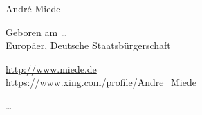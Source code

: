 \documentclass[10pt,a4paper]{scrartcl}
\begin{document}
    \begin{cv}{}
        \begin{cvlist}{}\label{PersDat}  
            \item   Andr\'e Miede
            \item   Geboren am \dots \\	
                    Europ\"aer, Deutsche Staatsb\"urgerschaft 
            \item   \url{http://www.miede.de} \\				
                    \url{https://www.xing.com/profile/Andre_Miede}				
        \end{cvlist}
        
        \begin{cvlist}{}\label{irgendwas}
            \item   \dots
        \end{cvlist}
    \end{cv}
\end{document}
